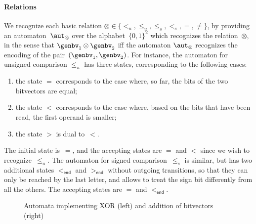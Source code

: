 \paragraph{Relations}
We recognize each basic relation $\otimes \in \{<_u, \leq_u, \leq_s, <_s,
=, \neq \}$, by providing an automaton~$\aut_\otimes$ over the
  alphabet~$\{0,1\}^2$ which recognizes the relation~$\otimes$, in the sense
  that $\genbv_1 \otimes \genbv_2$ iff the automaton $\aut_\otimes$ recognizes the encoding
  of the pair~$(\genbv_1, \genbv_2)$.
%
For instance, the automaton for unsigned comparison $\leq_u$ has three states,
corresponding to the following cases:
\begin{enumerate}
\item the state $=$ corresponds to the case where, so far, the bits of the two
  bitvectors are equal;
\item the state $<$ corresponds to the case where, based on the bits that have
  been read, the first operand is smaller;
\item the state $>$ is dual to~$<$.
\end{enumerate}
%
The initial state is~$=$, and the accepting states are $=$ and $<$ since we
wish to recognize~$\leq_u$.
%
The automaton for signed comparison~$\leq_s$ is similar, but has two additional
states $<_\textsf{end}$ and $>_\textsf{end}$ without outgoing transitions, so
that they can only be reached by the last letter, and allows to treat the
sign bit differently from all the others. The accepting states are $=$ and
$<_\textsf{end}$.

\begin{figure}
  \usetikzlibrary {arrows.meta,automata,positioning}
  \caption{Automata implementing XOR (left) and addition of bitvectors (right)}
  \label{fig:swbv:addition-nfa}
\end{figure}

